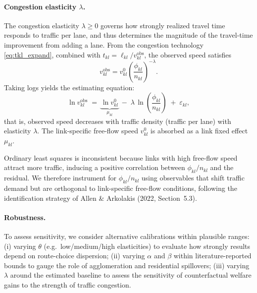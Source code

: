 \documentclass[12pt]{article}
\begin{document}
	\paragraph{Congestion elasticity $\lambda$.}
	The congestion elasticity $\lambda\geq 0$ governs how strongly realized travel time responds to traffic per lane, and thus determines the magnitude of the travel-time improvement from adding a lane. From the congestion technology \eqref{eq:tkl_expand}, combined with $t_{kl}=\ell_{kl}/v^{\text{obs}}_{kl}$, the observed speed satisfies
	\begin{equation}
		v^{\text{obs}}_{kl}
		=
		v^0_{kl}
		\left(
		\frac{\phi_{kl}}{n_{kl}}
		\right)^{-\lambda}.
	\end{equation}
	Taking logs yields the estimating equation:
	\begin{equation}\label{eq:est_lambda}
		\ln v^{\text{obs}}_{kl}
		\;=\;
		\underbrace{\ln v^0_{kl}}_{\mu_{kl}}
		\;-\;
		\lambda\,\ln\!\left(\frac{\phi_{kl}}{n_{kl}}\right)
		\;+\; \varepsilon_{kl},
	\end{equation}
	that is, observed speed decreases with traffic density (traffic per lane) with elasticity $\lambda$. The link-specific free-flow speed $v^0_{kl}$ is absorbed as a link fixed effect $\mu_{kl}$.

	Ordinary least squares is inconsistent because links with high free-flow speed attract more traffic, inducing a positive correlation between $\phi_{kl}/n_{kl}$ and the residual. We therefore instrument for $\phi_{kl}/n_{kl}$ using observables that shift traffic demand but are orthogonal to link-specific free-flow conditions, following the identification strategy of Allen \& Arkolakis (2022, Section~5.3).

	\paragraph{Robustness.} To assess sensitivity, we consider alternative calibrations within plausible ranges: (i) varying $\theta$ (e.g.\ low/medium/high elasticities) to evaluate how strongly results depend on route-choice dispersion; (ii) varying $\alpha$ and $\beta$ within literature-reported bounds to gauge the role of agglomeration and residential spillovers; (iii) varying $\lambda$ around the estimated baseline to assess the sensitivity of counterfactual welfare gains to the strength of traffic congestion.
	
\end{document}
